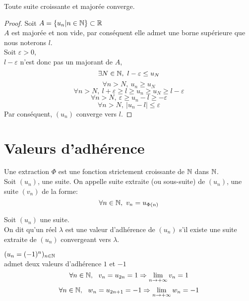 \documentclass[../main.tex]{subfile}
\begin{document}
\begin{theo}
	Toute suite croissante et majorée converge.
\end{theo}

\begin{proof}
	Soit $A = \{u_n | n \in \mathbb{N}\} \subset \mathbb{R}$\\
	$A$ est majorée et non vide, par conséquent elle admet une borne supérieure que nous noterons $l$.\\
	Soit $\varepsilon > 0$, \\
	$l-\varepsilon$ n'est donc pas un majorant de $A$, 
	$$\exists N \in \mathbb{N} , \ l- \varepsilon \leq u_N$$
	$$\forall n > N, \ u_n \geq u_N$$
	$$\forall n > N, \ l + \varepsilon \geq l \geq u_n \geq u_N \geq l - \varepsilon$$
	$$\forall n > N, \ \varepsilon \geq u_n -l \geq - \varepsilon$$
	$$\forall n > N, \ |u_n - l| \leq \varepsilon$$
	Par conséquent, $(u_n)$ converge vers $l$.
\end{proof}

\section{Valeurs d'adhérence}

\begin{defi}
	Une extraction $\Phi$ est une fonction strictement croissante de $\mathbb{N}$ dans $\mathbb{N}$.\\
	Soit $(u_n)$, une suite.
	On appelle suite extraite (ou sous-suite) de $(u_n)$, une suite $(v_n)$ de la forme:
	$$\forall n \in \mathbb{N}, \ v_n = u_{\Phi (n)}$$
\end{defi}

\begin{ex}
\end{ex}

\begin{defi}
	Soit $(u_n)$ une suite.\\
	On dit qu'un réel $\lambda$ est une valeur d'adhérence de $(u_n)$ s'il existe une suite extraite de $(u_n)$ convergeant vers $\lambda$.
\end{defi}

\begin{ex}
	$(u_n = (-1)^n)_{n \in \mathbb{N}}$\\
	admet deux valeurs d'adhérence $1$ et $-1$\\
	$$\forall n \in \mathbb{N} , \ \ v_n = u_{2n} = 1 \Rightarrow \lim\limits_{n \to + \infty} v_n = 1$$
	$$\forall n \in \mathbb{N} , \ \ w_n = u_{2n + 1} = -1 \Rightarrow \lim\limits_{n \to + \infty} w_n = -1$$
\end{ex}
\end{document}
